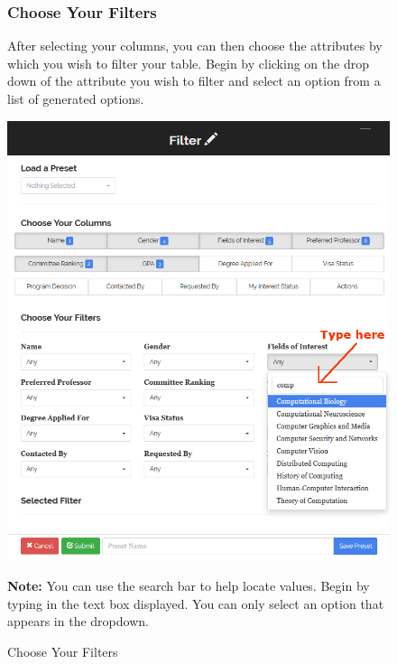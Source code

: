 \documentclass[fontsize=12pt,paper=letter,twoside]{scrartcl}
\begin{document}
\begin{figure}[!htb]
\subsubsection{Choose Your Filters}
After selecting your columns, you can then choose the attributes by which you wish to filter your table. Begin by clicking on the drop down of the attribute you wish to filter and select an option from a list of generated options.
\begin{center}
\includegraphics[width=.99\textwidth]{images/choose_filters.png}
\end{center}
\caption{Choose Your Filters}
\textbf{Note:} You can use the search bar to help locate values. Begin by typing in the text box displayed. You can only select an option that appears in the dropdown.
\label{fig:choose_filters}
\end{figure}
\end{document}
